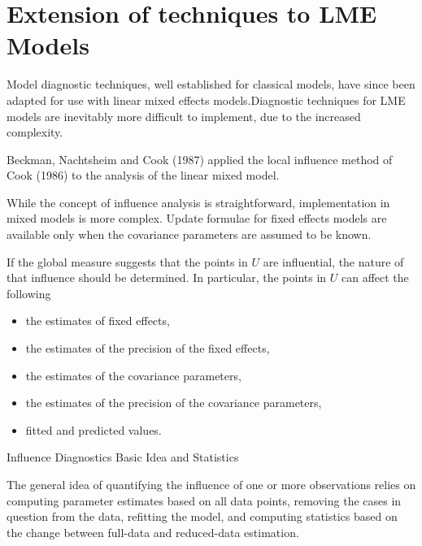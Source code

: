 \documentclass[Chap5amain.tex]{subfiles}
\begin{document}
\newpage
\section*{Extension of techniques to LME Models} %

Model diagnostic techniques, well established for classical models, have since been adapted for use with linear mixed effects models.Diagnostic techniques for LME models are inevitably more difficult to implement, due to the increased complexity.

Beckman, Nachtsheim and Cook (1987) \citet{Beckman} applied the local influence method of Cook (1986) to the analysis of the linear mixed model.

While the concept of influence analysis is straightforward, implementation in mixed models is more complex. Update formulae for fixed effects models are available only when the covariance parameters are assumed to be known.

If the global measure suggests that the points in $U$ are influential, the nature of that influence should be determined. In particular, the points in $U$ can affect the following

\begin{itemize}
\item the estimates of fixed effects,
\item the estimates of the precision of the fixed effects,
\item the estimates of the covariance parameters,
\item the estimates of the precision of the covariance parameters,
\item fitted and predicted values.
\end{itemize}

\newpage


Influence Diagnostics
Basic Idea and Statistics

The general idea of quantifying the influence of one or more observations relies on computing parameter estimates based on all data points, removing the cases in question from the data, refitting the model, and computing statistics based on the change between full-data and reduced-data estimation. 
\end{document}
